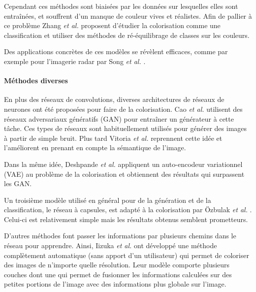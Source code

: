 \documentclass{article}
\begin{document}
Cependant ces méthodes sont biaisées par les données sur lesquelles elles sont entraînées, et souffrent d'un manque de couleur vives et réalistes.
Afin de pallier à ce problème Zhang \emph{et al.} \cite{journals/corr/ZhangIE16} proposent d'étudier la colorisation comme une classification et utiliser des méthodes de ré-équilibrage de classes sur les couleurs.

Des applications concrètes de ces modèles se révèlent efficaces, comme par exemple pour l'imagerie radar par Song \emph{et al.} \cite{journals/corr/SongXJ17}.



\paragraph{Méthodes diverses}
En plus des réseaux de convolutions, diverses architectures de réseaux de neurones ont été proposées pour faire de la colorisation.
Cao \emph{et al.} \cite{journals/corr/CaoZZY17} utilisent des réseaux adversariaux génératifs (GAN) pour entraîner un générateur à cette tâche. Ces types de réseaux sont habituellement utilisés pour générer des images à partir de simple bruit.
Plus tard Vitoria \emph{et al.} \cite{ChromaGAN} reprennent cette idée et l'améliorent en prenant en compte la sémantique de l'image.

Dans la même idée, Deshpande \emph{et al.} \cite{journals/corr/DeshpandeLYF16} appliquent un auto-encodeur variationnel (VAE) au problème de la colorisation et obtiennent des résultats qui surpassent les GAN.

Un troisième modèle utilisé en général pour de la génération et de la classification, le réseau à capsules, est adapté à la colorisation par Özbulak \textit{et al.} \cite{CapsNet}. Celui-ci est relativement simple mais les résultats obtenus semblent prometteurs.

D'autres méthodes font passer les informations par plusieurs chemins dans le réseau pour apprendre.
Ainsi, Iizuka \textit{et al.} \cite{10.1145/2897824.2925974} ont développé une méthode complètement automatique (sans apport d'un utilisateur) qui permet de coloriser des images de n'importe quelle résolution.
Leur modèle comporte plusieurs couches dont une qui permet de fusionner les informations calculées sur des petites portions de l'image avec des informations plus globale sur l'image.
\end{document}
